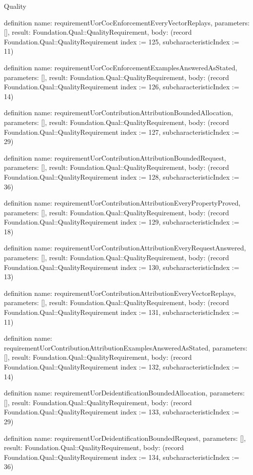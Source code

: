 \begin{lexlean}{Quality}
\begin{semanticmodule}
definition{
  name: requirementUorCocEnforcementEveryVectorReplays,
  parameters: [],
  result: Foundation.Qual::QualityRequirement,
  body: (record Foundation.Qual::QualityRequirement {index := 125, subcharacteristicIndex := 11})
}

definition{
  name: requirementUorCocEnforcementExamplesAnsweredAsStated,
  parameters: [],
  result: Foundation.Qual::QualityRequirement,
  body: (record Foundation.Qual::QualityRequirement {index := 126, subcharacteristicIndex := 14})
}

definition{
  name: requirementUorContributionAttributionBoundedAllocation,
  parameters: [],
  result: Foundation.Qual::QualityRequirement,
  body: (record Foundation.Qual::QualityRequirement {index := 127, subcharacteristicIndex := 29})
}

definition{
  name: requirementUorContributionAttributionBoundedRequest,
  parameters: [],
  result: Foundation.Qual::QualityRequirement,
  body: (record Foundation.Qual::QualityRequirement {index := 128, subcharacteristicIndex := 36})
}

definition{
  name: requirementUorContributionAttributionEveryPropertyProved,
  parameters: [],
  result: Foundation.Qual::QualityRequirement,
  body: (record Foundation.Qual::QualityRequirement {index := 129, subcharacteristicIndex := 18})
}

definition{
  name: requirementUorContributionAttributionEveryRequestAnswered,
  parameters: [],
  result: Foundation.Qual::QualityRequirement,
  body: (record Foundation.Qual::QualityRequirement {index := 130, subcharacteristicIndex := 13})
}

definition{
  name: requirementUorContributionAttributionEveryVectorReplays,
  parameters: [],
  result: Foundation.Qual::QualityRequirement,
  body: (record Foundation.Qual::QualityRequirement {index := 131, subcharacteristicIndex := 11})
}

definition{
  name: requirementUorContributionAttributionExamplesAnsweredAsStated,
  parameters: [],
  result: Foundation.Qual::QualityRequirement,
  body: (record Foundation.Qual::QualityRequirement {index := 132, subcharacteristicIndex := 14})
}

definition{
  name: requirementUorDeidentificationBoundedAllocation,
  parameters: [],
  result: Foundation.Qual::QualityRequirement,
  body: (record Foundation.Qual::QualityRequirement {index := 133, subcharacteristicIndex := 29})
}

definition{
  name: requirementUorDeidentificationBoundedRequest,
  parameters: [],
  result: Foundation.Qual::QualityRequirement,
  body: (record Foundation.Qual::QualityRequirement {index := 134, subcharacteristicIndex := 36})
}


\end{semanticmodule}
\end{lexlean}
